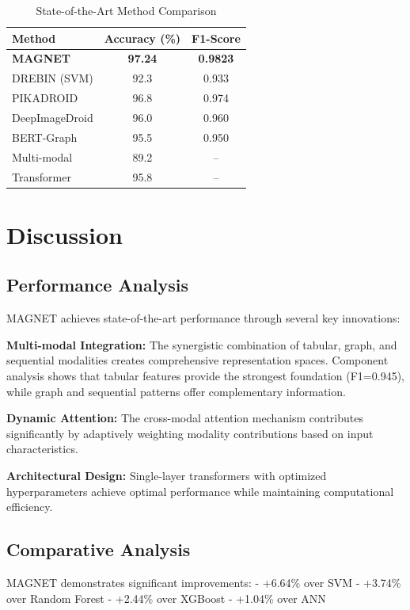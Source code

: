 \documentclass[a4paper,11pt]{article}
\begin{document}
\begin{table}[!htb]
  \centering
  \caption{State-of-the-Art Method Comparison}
  \label{tab:literature_comparison}
  \begin{tabular}{@{}lcc@{}}
    \toprule
    \textbf{Method} & \textbf{Accuracy (\%)} & \textbf{F1-Score} \\
    \midrule
    \textbf{MAGNET} & \textbf{97.24} & \textbf{0.9823} \\
    DREBIN (SVM) & 92.3 & 0.933 \\
    PIKADROID & 96.8 & 0.974 \\
    DeepImageDroid & 96.0 & 0.960 \\
    BERT-Graph & 95.5 & 0.950 \\
    Multi-modal & 89.2 & -- \\
    Transformer & 95.8 & -- \\
    \bottomrule
  \end{tabular}
\end{table}

\section{Discussion}
\subsection{Performance Analysis}
MAGNET achieves state-of-the-art performance through several key innovations:

\textbf{Multi-modal Integration:} The synergistic combination of tabular, graph, and sequential modalities creates comprehensive representation spaces. Component analysis shows that tabular features provide the strongest foundation (F1=0.945), while graph and sequential patterns offer complementary information.

\textbf{Dynamic Attention:} The cross-modal attention mechanism contributes significantly by adaptively weighting modality contributions based on input characteristics.

\textbf{Architectural Design:} Single-layer transformers with optimized hyperparameters achieve optimal performance while maintaining computational efficiency.

\subsection{Comparative Analysis}
MAGNET demonstrates significant improvements:
- +6.64\% over SVM
- +3.74\% over Random Forest
- +2.44\% over XGBoost
- +1.04\% over ANN
\end{document}
